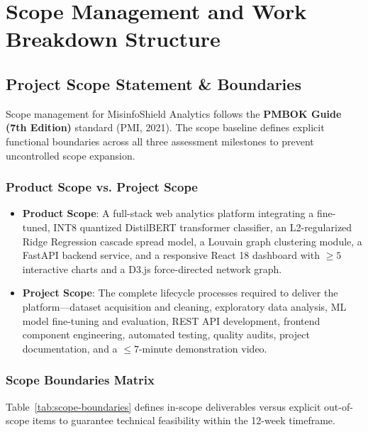 \documentclass[11pt, a4paper]{article}
\begin{document}
\section{Scope Management and Work Breakdown Structure}
\label{sec:scope-management}

\subsection{Project Scope Statement \& Boundaries}
Scope management for MisinfoShield Analytics follows the \textbf{PMBOK Guide (7th Edition)} standard (PMI, 2021). The scope baseline defines explicit functional boundaries across all three assessment milestones to prevent uncontrolled scope expansion.

\subsubsection{Product Scope vs. Project Scope}
\begin{itemize}
  \item \textbf{Product Scope}: A full-stack web analytics platform integrating a fine-tuned, INT8 quantized DistilBERT transformer classifier, an L2-regularized Ridge Regression cascade spread model, a Louvain graph clustering module, a FastAPI backend service, and a responsive React 18 dashboard with $\ge 5$ interactive charts and a D3.js force-directed network graph.
  \item \textbf{Project Scope}: The complete lifecycle processes required to deliver the platform---dataset acquisition and cleaning, exploratory data analysis, ML model fine-tuning and evaluation, REST API development, frontend component engineering, automated testing, quality audits, project documentation, and a $\le 7$-minute demonstration video.
\end{itemize}

\subsubsection{Scope Boundaries Matrix}
Table~\ref{tab:scope-boundaries} defines in-scope deliverables versus explicit out-of-scope items to guarantee technical feasibility within the 12-week timeframe.
\end{document}

